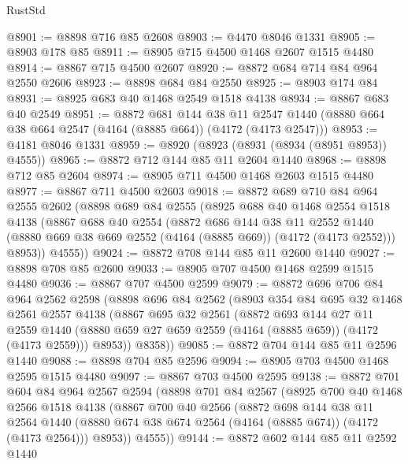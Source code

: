 \begin{lexlean}{RustStd}
\begin{coremodule}
@8901 := @8898 @716 @85 @2608
@8903 := @4470 @8046 @1331
@8905 := @8903 @178 @85
@8911 := @8905 @715 @4500 @1468 @2607 @1515 @4480
@8914 := @8867 @715 @4500 @2607
@8920 := @8872 @684 @714 @84 @964 @2550 @2606
@8923 := @8898 @684 @84 @2550
@8925 := @8903 @174 @84
@8931 := @8925 @683 @40 @1468 @2549 @1518 @4138
@8934 := @8867 @683 @40 @2549
@8951 := @8872
    @681
    @144
    @38
    @11
    @2547
    @1440
    (@8880 @664 @38 @664 @2547 (@4164 (@8885 @664)) (@4172 (@4173 @2547)))
@8953 := @4181 @8046 @1331
@8959 := @8920 (@8923 (@8931 (@8934 (@8951 @8953)) @4555))
@8965 := @8872 @712 @144 @85 @11 @2604 @1440
@8968 := @8898 @712 @85 @2604
@8974 := @8905 @711 @4500 @1468 @2603 @1515 @4480
@8977 := @8867 @711 @4500 @2603
@9018 := @8872
    @689
    @710
    @84
    @964
    @2555
    @2602
    (@8898
      @689
      @84
      @2555
      (@8925
        @688
        @40
        @1468
        @2554
        @1518
        @4138
        (@8867
          @688
          @40
          @2554
          (@8872
            @686
            @144
            @38
            @11
            @2552
            @1440
            (@8880 @669 @38 @669 @2552 (@4164 (@8885 @669)) (@4172 (@4173 @2552)))
            @8953))
        @4555))
@9024 := @8872 @708 @144 @85 @11 @2600 @1440
@9027 := @8898 @708 @85 @2600
@9033 := @8905 @707 @4500 @1468 @2599 @1515 @4480
@9036 := @8867 @707 @4500 @2599
@9079 := @8872
    @696
    @706
    @84
    @964
    @2562
    @2598
    (@8898
      @696
      @84
      @2562
      (@8903
        @354
        @84
        @695
        @32
        @1468
        @2561
        @2557
        @4138
        (@8867
          @695
          @32
          @2561
          (@8872
            @693
            @144
            @27
            @11
            @2559
            @1440
            (@8880 @659 @27 @659 @2559 (@4164 (@8885 @659)) (@4172 (@4173 @2559)))
            @8953))
        @8358))
@9085 := @8872 @704 @144 @85 @11 @2596 @1440
@9088 := @8898 @704 @85 @2596
@9094 := @8905 @703 @4500 @1468 @2595 @1515 @4480
@9097 := @8867 @703 @4500 @2595
@9138 := @8872
    @701
    @604
    @84
    @964
    @2567
    @2594
    (@8898
      @701
      @84
      @2567
      (@8925
        @700
        @40
        @1468
        @2566
        @1518
        @4138
        (@8867
          @700
          @40
          @2566
          (@8872
            @698
            @144
            @38
            @11
            @2564
            @1440
            (@8880 @674 @38 @674 @2564 (@4164 (@8885 @674)) (@4172 (@4173 @2564)))
            @8953))
        @4555))
@9144 := @8872 @602 @144 @85 @11 @2592 @1440

\end{coremodule}
\end{lexlean}
